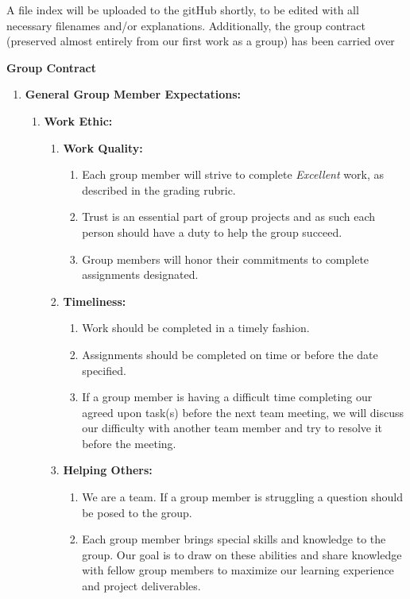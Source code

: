 \documentclass[12pt]{article}
\begin{document}
A file index will be uploaded to the gitHub shortly, to be edited with all necessary filenames and/or explanations. Additionally, the group contract (preserved almost entirely from our first work as a group) has been carried over

\pagebreak

\textbf{Group Contract}
\begin{enumerate}
\item \textbf{General Group Member Expectations:} 
\begin{enumerate}
\item \textbf{Work Ethic:}
\begin{enumerate}
\item \textbf{Work Quality: }
\begin{enumerate}
\item  Each group member will strive to complete \emph{Excellent} work, as described in the grading rubric. 
\item Trust is an essential part of group projects and as such each person should have a duty to help the group succeed. 
\item Group members will honor their commitments to complete assignments designated. 
\end{enumerate}
\item \textbf{Timeliness: }
\begin{enumerate}
\item Work should be completed in a timely fashion.
\item Assignments should be completed on time or before the date specified. 
\item If a group member is having a difficult time completing our agreed upon task(s) before the next team meeting, we will discuss our difficulty with another team member and try to resolve it before the meeting. 
\end{enumerate}
\item \textbf{Helping Others: }
\begin{enumerate}
\item We are a team.  If a group member is struggling a question should be posed to the group.  
\item Each group member brings special skills and knowledge to the group.  Our goal is to draw on these abilities and share knowledge with fellow group members to maximize our learning experience and project deliverables. 
\end{enumerate}
\end{enumerate}


\end{enumerate}
\end{enumerate}
\end{document}
